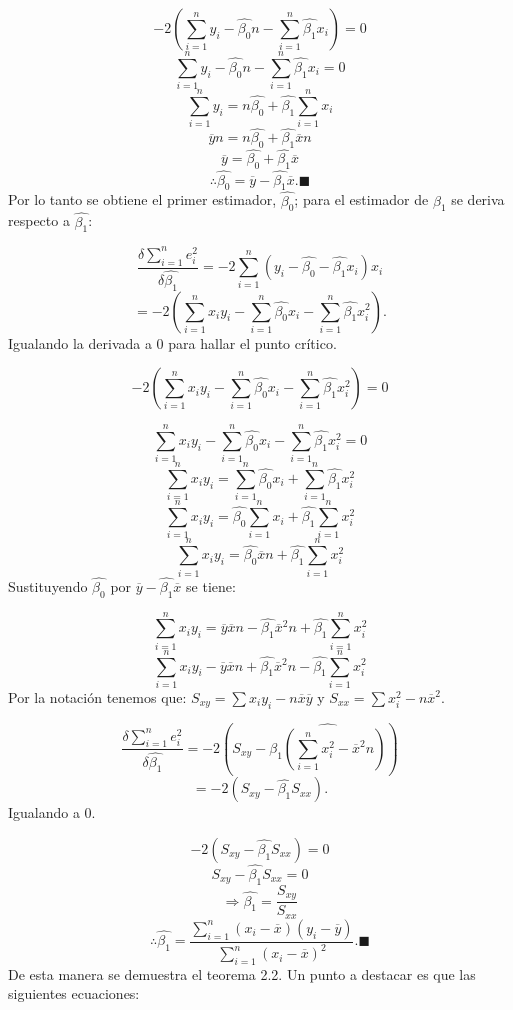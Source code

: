 \documentclass[
  a4paper,
  oneside,
  openany]{book}
\begin{document}
\[-2\left(\sum_{i=1}^{n}y_{i}-\hat{\beta_{0}}n-\sum_{i=1}^{n}\hat{\beta_{1}}x_{i}\right)=0\]
\[\sum_{i=1}^{n}y_{i}-\hat{\beta_{0}}n-\sum_{i=1}^{n}\hat{\beta_{1}}x_{i}=0\]
\[\sum_{i=1}^{n}y_{i}=n\hat{\beta_{0}}+\hat{\beta_{1}}\sum_{i=1}^{n}x_{i}\]
\[\overline{y}n=n\hat{\beta_{0}}+\hat{\beta_{1}}\overline{x}n\]
\[\overline{y}=\hat{\beta_{0}}+\hat{\beta_{1}}\overline{x}\]
\[\therefore\hat{\beta_{0}}=\overline{y}-\hat{\beta_{1}}\overline{x}.\blacksquare\]
Por lo tanto se obtiene el primer estimador, \(\hat{\beta_{0}}\); para el estimador de \(\beta_{1}\) se deriva respecto a \(\hat{\beta_{1}}\):

\[\frac{\delta\sum_{i=1}^{n}e_{i}^2}{\delta\hat{\beta_{1}}}=-2\sum_{i=1}^{n}(y_{i}-\hat{\beta_{0}}-\hat{\beta_{1}}x_{i})x_{i}\]
\[=-2\left(\sum_{i=1}^{n}x_{i}y_{i}-\sum_{i=1}^{n}\hat{\beta_{0}}x_{i}-\sum_{i=1}^{n}\hat{\beta_{1}}x_{i}^2\right).\]
Igualando la derivada a 0 para hallar el punto crítico.

\[-2\left(\sum_{i=1}^{n}x_{i}y_{i}-\sum_{i=1}^{n}\hat{\beta_{0}}x_{i}-\sum_{i=1}^{n}\hat{\beta_{1}}x_{i}^2\right)=0\]

\[\sum_{i=1}^{n}x_{i}y_{i}-\sum_{i=1}^{n}\hat{\beta_{0}}x_{i}-\sum_{i=1}^{n}\hat{\beta_{1}}x_{i}^2=0\]
\[\sum_{i=1}^{n}x_{i}y_{i}=\sum_{i=1}^{n}\hat{\beta_{0}}x_{i}+\sum_{i=1}^{n}\hat{\beta_{1}}x_{i}^2\]
\[\sum_{i=1}^{n}x_{i}y_{i}=\hat{\beta_{0}}\sum_{i=1}^{n}x_{i}+\hat{\beta_{1}}\sum_{i=1}^{n}x_{i}^2\]
\[\sum_{i=1}^{n}x_{i}y_{i}=\hat{\beta_{0}}\overline{x}n+\hat{\beta_{1}}\sum_{i=1}^{n}x_{i}^2\]
Sustituyendo \(\hat{\beta_{0}}\) por \(\overline{y}-\hat{\beta_{1}}\overline{x}\) se tiene:

\[\sum_{i=1}^{n}x_{i}y_{i}=\overline{y}\overline{x}n-\hat{\beta_{1}}\overline{x}^2n+\hat{\beta_{1}}\sum_{i=1}^{n}x_{i}^2\]
\[\sum_{i=1}^{n}x_{i}y_{i}-\overline{y}\overline{x}n+\hat{\beta_{1}}\overline{x}^2n-\hat{\beta_{1}}\sum_{i=1}^{n}x_{i}^2\]
Por la notación tenemos que: \(S_{xy}=\sum x_{i}y_{i} - n \overline{x}\overline{y}\) y \(S_{xx}= \sum x_{i}^2 - n\overline{x}^2.\)

\[\frac{\delta \sum_{i=1}^{n}e_{i}^2}{\delta\hat{\beta_{1}}}=-2\left(S_{xy}-\hat{\beta_{1}\left(\sum_{i=1}^{n}x_{i}^2-\overline{x}^2n\right)}\right)\]
\[=-2(S_{xy}-\hat{\beta_{1}}S_{xx}).\]
Igualando a 0.

\[-2(S_{xy}-\hat{\beta_{1}}S_{xx})=0\]
\[S_{xy}-\hat{\beta_{1}}S_{xx}=0\]
\[\Rightarrow \hat{\beta_{1}}=\frac{S_{xy}}{S_{xx}}\]
\[\therefore \hat{\beta_{1}}=\frac{\sum_{i=1}^{n}(x_{i}-\overline{x})(y_{i}-\overline{y})}{\sum_{i=1}^{n}(x_{i}-\overline{x})^2}.\blacksquare\]
De esta manera se demuestra el teorema 2.2. Un punto a destacar es que las siguientes ecuaciones:
\end{document}
